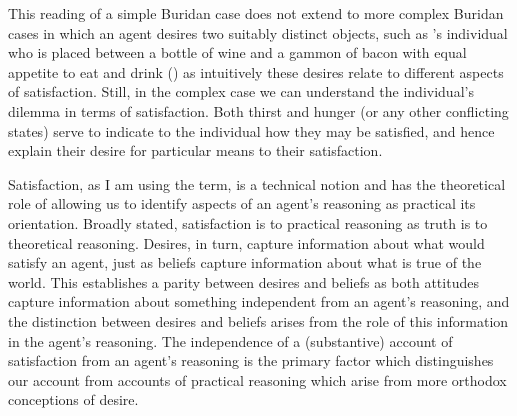 \documentclass[10pt]{article}
\begin{document}
This reading of a simple Buridan case does not extend to more complex Buridan cases in which an agent desires two suitably distinct objects, such as \citeauthor{Montaigne:1965aa}'s individual who is placed between a bottle of wine and a gammon of bacon with equal appetite to eat and drink (\cite[cf.][156]{Rescher:1960aa}) as intuitively these desires relate to different aspects of satisfaction.
Still, in the complex case we can understand the individual's dilemma in terms of satisfaction.
Both thirst and hunger (or any other conflicting states) serve to indicate to the individual how they may be satisfied, and hence explain their desire for particular means to their satisfaction.

Satisfaction, as I am using the term, is a technical notion and has the theoretical role of allowing us to identify aspects of an agent's reasoning as practical its orientation.
Broadly stated, satisfaction is to practical reasoning as truth is to theoretical reasoning.
Desires, in turn, capture information about what would satisfy an agent, just as beliefs capture information about what is true of the world.
This establishes a parity between desires and beliefs as both attitudes capture information about something independent from an agent's reasoning, and the distinction between desires and beliefs arises from the role of this information in the agent's reasoning.
The independence of a (substantive) account of satisfaction from an agent's reasoning is the primary factor which distinguishes our account from accounts of practical reasoning which arise from more orthodox conceptions of desire.
\end{document}
